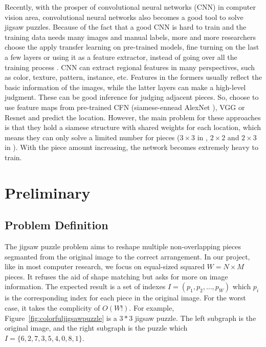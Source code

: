 \documentclass{article}
\begin{document}
Recently, with the prosper of convolutional neural networks (CNN) in computer vision area, convolutional neural networks also becomes a good tool to solve jigsaw puzzles. Because of the fact that a good CNN is hard to train and the training data needs many images and manual labels, more and more researchers choose the apply transfer learning on pre-trained models, fine turning on the last a few layers or using it as a feature extractor, instead of going over all the training process \cite{razavian2014cnn}. CNN can extract regional features in many perspectives, such as color, texture, pattern, instance, etc. Features in the formers usually reflect the basic information of the images, while the latter layers can make a high-level judgment. These can be good inference for judging adjacent pieces. So, \cite{deryneural,noroozi2016unsupervised} choose to use feature maps from pre-trained CFN \cite{noroozi2016unsupervised} (siamese-ennead AlexNet \cite{krizhevsky2012imagenet}), VGG \cite{he2016deep} or Resnet \cite{simonyan2014very} and predict the location. However, the main problem for these approaches is that they hold a siamese structure with shared weights for each location, which means they can only solve a limited number for pieces ($3\times3$ in \cite{noroozi2016unsupervised}, $2\times2$ and $2\times3$ in \cite{deryneural}). With the piece amount increasing, the network becomes extremely heavy to train.

\section{Preliminary}

\subsection{Problem Definition}

The jigsaw puzzle problem aims to reshape multiple non-overlapping pieces segmanted from the original image to the correct arrangement. In our project, like in most computer research, we focus on equal-sized squared $W=N\times M$ pieces. It refuses the aid of shape matching but asks for more on image information. The expected result is a set of indexes $I=(p_1,p_2,\dots,p_W)$ which $p_i$ is the corresponding index for each piece in the original image. For the worst case, it takes the complicity of $O(W!)$. For example, Figure~\ref{fig:colorfuljigsawpuzzle} is a $3*3$ jigsaw puzzle. The left subgraph is the original image, and the right subgraph is the puzzle which $I=\{6,2,7,3,5,4,0,8,1\}$.
\end{document}
